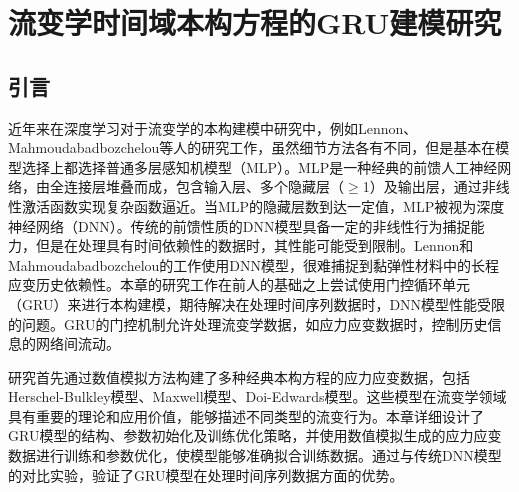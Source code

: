 \chapter{流变学时间域本构方程的GRU建模研究}
\section{引言}
近年来在深度学习对于流变学的本构建模中研究中，例如Lennon、Mahmoudabadbozchelou等人的研究工作，虽然细节方法各有不同，但是基本在模型选择上都选择普通多层感知机模型（MLP）\cite{lennonScientificMachineLearning2023a,mahmoudabadbozchelouDatadrivenPhysicsinformedConstitutive2021}。MLP是一种经典的前馈人工神经网络，由全连接层堆叠而成，包含输入层、多个隐藏层（$\geqslant$1）及输出层，通过非线性激活函数实现复杂函数逼近。当MLP的隐藏层数到达一定值，MLP被视为深度神经网络（DNN）。传统的前馈性质的DNN模型具备一定的非线性行为捕捉能力，但是在处理具有时间依赖性的数据时，其性能可能受到限制。Lennon和Mahmoudabadbozchelou的工作使用DNN模型，很难捕捉到黏弹性材料中的长程应变历史依赖性。本章的研究工作在前人的基础之上尝试使用门控循环单元（GRU）来进行本构建模，期待解决在处理时间序列数据时，DNN模型性能受限的问题。GRU的门控机制允许处理流变学数据，如应力应变数据时，控制历史信息的网络间流动。

研究首先通过数值模拟方法构建了多种经典本构方程的应力应变数据，包括Herschel-Bulkley模型、Maxwell模型、Doi-Edwards模型。这些模型在流变学领域具有重要的理论和应用价值，能够描述不同类型的流变行为。本章详细设计了GRU模型的结构、参数初始化及训练优化策略，并使用数值模拟生成的应力应变数据进行训练和参数优化，使模型能够准确拟合训练数据。通过与传统DNN模型的对比实验，验证了GRU模型在处理时间序列数据方面的优势。

